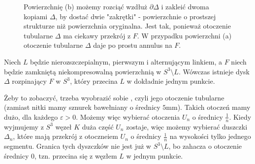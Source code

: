\documentclass{article}
\begin{document}
\begin{figure}
{
}
\caption{\label{pierwszy} Powierzchnię (b) możemy rozciąć wzdłuż $\partial\Delta$ i zakleić dwoma kopiami $\Delta$, by dostać dwie "zakrętki" - powierzchnie o prostszej strukturze niż powierzchnia oryginalna. Jest tak, ponieważ otoczenie tubularne $\Delta$ ma ciekawy przekrój z $F$. W przypadku powierzchni (a) otoczenie tubularne $\Delta$ daje po prostu annulus na $F$. }%
\end{figure}

\begin{fuck}
  Niech $L$ będzie nierozszczepialnym, pierwszym i alternującym linkiem, a $F$ niech będzie zamkniętą niekompresowalną powierzchnią w $S^3\setminus L$. Wówczas istnieje dysk $\Delta$ rozpinający $F$ w $S^3$, który przecina $L$ w dokładnie jednym punkcie.
\end{fuck}

Żeby to zobaczyć, trzeba wyobrazić sobie , czyli jego otoczenie tubularne (zamiast nitki mamy sznurek bawełniany o średnicy $5$mm). Takich otoczeń mamy dużo, dla każdego $\varepsilon>0$. Możemy więc wybierać otoczenia $U_n$ o średnicy $\frac{1}{n}$. Kiedy wyjmujemy z $S^3$ węzeł $K$ duża część $U_n$ zostaje, więc możemy wybierać duszczki $\Delta_n$, które mają przekrój z otoczneiem $U_n$ o średnicy $\frac{1}{n}$ na wysokości tylko jednego segmentu. Granica tych dyszczków nie jest już w $S^3\setminus L$, bo zahacza o otoczenie średnicy $0$, tzn. przecina się z węzłem $L$ w jednym punkcie.
\end{document}
